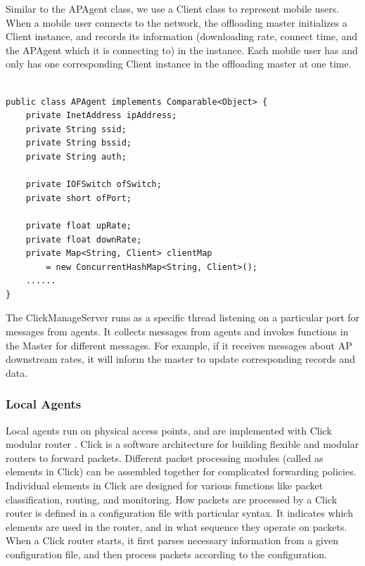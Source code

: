 \documentclass[english]{tktltiki}
\begin{document}
Similar to the APAgent class, we use a Client class to represent mobile users. When a mobile user connects to the network, the offloading master initializes a Client instance, and records its information (downloading rate, connect time, and the APAgent which it is connecting to) in the instance. Each mobile user has and only has one corresponding Client instance in the offloading master at one time.

\begin{lstlisting}

public class APAgent implements Comparable<Object> {
    private InetAddress ipAddress;
    private String ssid;
    private String bssid;
    private String auth;
    
    private IOFSwitch ofSwitch;
    private short ofPort;

    private float upRate;
    private float downRate;
    private Map<String, Client> clientMap 
        = new ConcurrentHashMap<String, Client>();
    ......
}
\end{lstlisting}

The ClickManageServer runs as a specific thread listening on a particular port for messages from agents. It collects messages from agents and invokes functions in the Master for different messages. For example, if it receives messages about AP downstream rates, it will inform the master to update corresponding records and data.

\subsubsection{Local Agents}

Local agents run on physical access points, and are implemented with Click modular router \cite{click}. Click is a software architecture for building flexible and modular routers to forward packets. Different packet processing modules (called as elements in Click) can be assembled together for complicated forwarding policies. Individual elements in Click are designed for various functions like packet classification, routing, and monitoring. How packets are processed by a Click router is defined in a configuration file with particular syntax. It indicates which elements are used in the router, and in what sequence they operate on packets. When a Click router starts, it first parses necessary information from a given configuration file, and then process packets according to the configuration.
\end{document}
